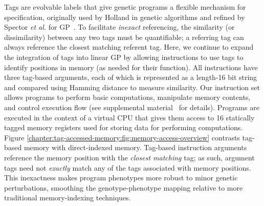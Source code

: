 Tags are evolvable labels that give genetic programs a flexible mechanism for specification, originally used by Holland in genetic algorithms \citep{holland_effect_1993} and refined by Spector \textit{et al.} for GP~\citep{spector_tag-based_2011}.
To facilitate \textit{inexact} referencing, the similarity (or dissimilarity) between any two tags must be quantifiable; a referring tag can always reference the closest matching referent tag.
Here, we continue to expand the integration of tags into linear GP by allowing instructions to use tags to identify positions in memory (as needed for their function).
All instructions have three tag-based arguments, each of which is represented as a length-16 bit string and compared using Hamming distance to measure similarity.
Our instruction set allows programs to perform basic computations, manipulate memory contents, and control execution flow (see supplemental material~\citep{tag_accessed_memory_supplement_2019} for details).
Programs are executed in the context of a virtual CPU that gives them access to 16 statically tagged memory registers used for storing data for performing computations.
Figure \ref{chapter:tag-accessed-memory:fig:memory-access-overview} contrasts tag-based memory with direct-indexed memory.
Tag-based instruction arguments reference the memory position with the \textit{closest matching} tag; as such, argument tags need not \textit{exactly} match any of the tags associated with memory positions.
This inexactness makes program phenotypes more robust to minor genetic perturbations, smoothing the genotype-phenotype mapping relative to more traditional memory-indexing techniques.
